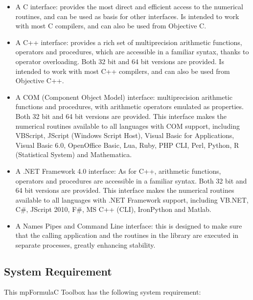 \begin{itemize}	

\item A C interface: provides the most direct and efficient access to the numerical routines, and can be used as basis for other interfaces. Is intended to work with most C compilers, and can also be used from Objective C.
\item A C++ interface: provides a rich set of multiprecision arithmetic functions, operators and procedures, which are accessible in a familiar syntax, thanks to operator overloading. Both 32 bit and 64 bit versions are provided. Is intended to work with most C++ compilers, and can also be used from Objective C++.
\item A COM (Component Object Model) interface: multiprecision arithmetic functions and procedures, with arithmetic operators emulated as properties. Both 32 bit and 64 bit versions are provided. This interface makes the numerical routines available to all languages with COM support, including VBScript, JScript (Windows Script Host), Visual Basic for Applications, Visual Basic 6.0, OpenOffice  Basic, Lua, Ruby, PHP CLI, Perl, Python, R (Statistical System) and Mathematica.
\item A .NET Framework 4.0 interface: As for C++, arithmetic functions, operators and procedures are accessible in a familiar syntax. Both 32 bit and 64 bit versions are provided. This interface makes the numerical routines available to all languages with .NET Framework support, including VB.NET, C\#, JScript 2010, F\#, MS C++ (CLI), IronPython and Matlab.
\item A Names Pipes and Command Line interface: this is designed to make sure that the calling application and the routines in the library are executed in separate processes, greatly enhancing stability. 

\end{itemize}
	



\subsection{System Requirement}
\label{System Requirements}
This mpFormulaC Toolbox has the following system requirement:

